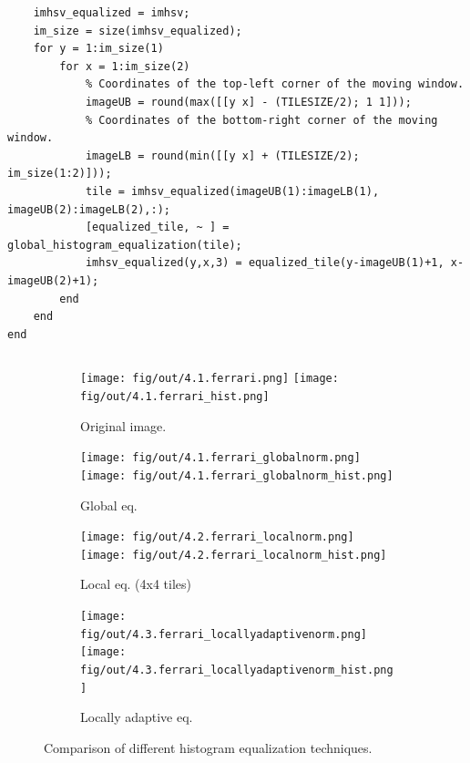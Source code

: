 \documentclass[tikz,14pt,fleqn]{article}
\begin{document}
\begin{itemize}
\begin{verbatim}
    imhsv_equalized = imhsv;
    im_size = size(imhsv_equalized);
    for y = 1:im_size(1)
        for x = 1:im_size(2)
            % Coordinates of the top-left corner of the moving window.
            imageUB = round(max([[y x] - (TILESIZE/2); 1 1]));
            % Coordinates of the bottom-right corner of the moving window.
            imageLB = round(min([[y x] + (TILESIZE/2); im_size(1:2)]));
            tile = imhsv_equalized(imageUB(1):imageLB(1), imageUB(2):imageLB(2),:);
            [equalized_tile, ~ ] = global_histogram_equalization(tile);
            imhsv_equalized(y,x,3) = equalized_tile(y-imageUB(1)+1, x-imageUB(2)+1);
        end
    end
end
    \end{verbatim}
\begin{verbatim} 

\end{verbatim}
\end{itemize}
\begin{figure}[h!]
    \begin{subfigure}{0.24\textwidth}
        \centering
        \texttt{[image: fig/out/4.1.ferrari.png]}
        \texttt{[image: fig/out/4.1.ferrari\_hist.png]}
        \caption{Original image.}
    \end{subfigure}
    \begin{subfigure}{0.24\textwidth}
        \centering
        \texttt{[image: fig/out/4.1.ferrari\_globalnorm.png]}
        \texttt{[image: fig/out/4.1.ferrari\_globalnorm\_hist.png]}
        \caption{Global eq.}
        \label{fig:4.1.ferrari_globalnorm}
    \end{subfigure}
    \begin{subfigure}{0.24\textwidth}
        \centering
        \texttt{[image: fig/out/4.2.ferrari\_localnorm.png]}
        \texttt{[image: fig/out/4.2.ferrari\_localnorm\_hist.png]}
        \caption{Local eq. (4x4 tiles)}
        \label{fig:4.2.ferrari_localnorm}
    \end{subfigure}
    \begin{subfigure}{0.24\textwidth}
        \centering
        \texttt{[image: fig/out/4.3.ferrari\_locallyadaptivenorm.png]}
        \texttt{[image: fig/out/4.3.ferrari\_locallyadaptivenorm\_hist.png]}
        \caption{Locally adaptive eq.}
        \label{fig:4.3.ferrari_adaptivenorm}
    \end{subfigure}

    \caption{Comparison of different histogram equalization techniques.}
\end{figure}
\end{document}
